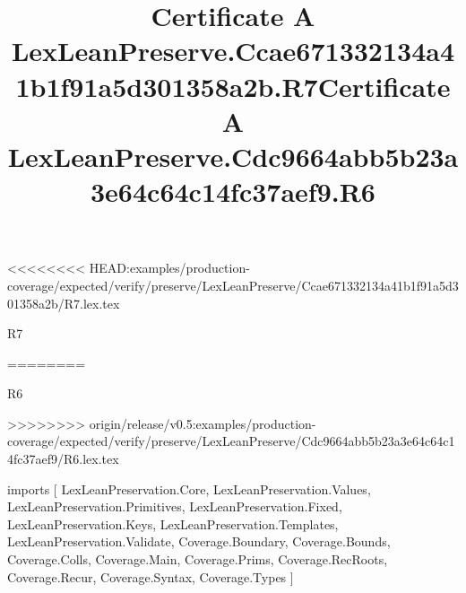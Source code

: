 <<<<<<<< HEAD:examples/production-coverage/expected/verify/preserve/LexLeanPreserve/Ccae671332134a41b1f91a5d301358a2b/R7.lex.tex
\begin{lexlean}{R7}
\title{Certificate A LexLeanPreserve.Ccae671332134a41b1f91a5d301358a2b.R7}
========
\begin{lexlean}{R6}
\title{Certificate A LexLeanPreserve.Cdc9664abb5b23a3e64c64c14fc37aef9.R6}
>>>>>>>> origin/release/v0.5:examples/production-coverage/expected/verify/preserve/LexLeanPreserve/Cdc9664abb5b23a3e64c64c14fc37aef9/R6.lex.tex
\begin{coremodule}
imports [
  LexLeanPreservation.Core,
  LexLeanPreservation.Values,
  LexLeanPreservation.Primitives,
  LexLeanPreservation.Fixed,
  LexLeanPreservation.Keys,
  LexLeanPreservation.Templates,
  LexLeanPreservation.Validate,
  Coverage.Boundary,
  Coverage.Bounds,
  Coverage.Colls,
  Coverage.Main,
  Coverage.Prims,
  Coverage.RecRoots,
  Coverage.Recur,
  Coverage.Syntax,
  Coverage.Types
]


\end{coremodule}
\end{lexlean}
\end{lexlean}
